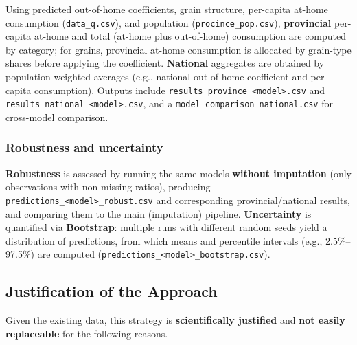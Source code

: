 Using predicted out-of-home coefficients, grain structure, per-capita at-home consumption (\texttt{data\_q.csv}), and population (\texttt{procince\_pop.csv}), \textbf{provincial} per-capita at-home and total (at-home plus out-of-home) consumption are computed by category; for grains, provincial at-home consumption is allocated by grain-type shares before applying the coefficient. \textbf{National} aggregates are obtained by population-weighted averages (e.g., national out-of-home coefficient and per-capita consumption). Outputs include \texttt{results\_province\_<model>.csv} and \texttt{results\_national\_<model>.csv}, and a \texttt{model\_comparison\_national.csv} for cross-model comparison.

\subsubsection{Robustness and uncertainty}
\label{subsec:robustness}

\textbf{Robustness} is assessed by running the same models \textbf{without imputation} (only observations with non-missing ratios), producing \texttt{predictions\_<model>\_robust.csv} and corresponding provincial/national results, and comparing them to the main (imputation) pipeline. \textbf{Uncertainty} is quantified via \textbf{Bootstrap}: multiple runs with different random seeds yield a distribution of predictions, from which means and percentile intervals (e.g., 2.5\%--97.5\%) are computed (\texttt{predictions\_<model>\_bootstrap.csv}).

\subsection{Justification of the Approach}
\label{subsec:justification}

Given the existing data, this strategy is \textbf{scientifically justified} and \textbf{not easily replaceable} for the following reasons.

